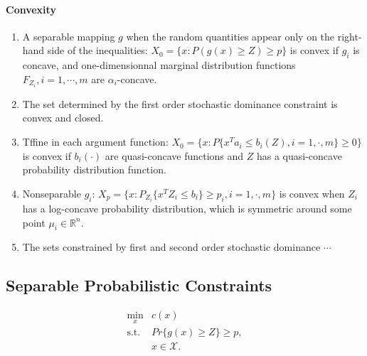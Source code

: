 \documentclass[a4pper,11pt]{article}
\begin{document}
\paragraph{Convexity}
\begin{enumerate}
    \item A separable mapping $g$ when the random quantities appear only on the right-hand side of the inequalities: $X_0=\{x: P(g(x)\geq Z) \geq p\}$ is convex if $g_i$ is concave, and one-dimensionnal marginal distribution functions $F_{Z_i}, i=1,\cdots,m$ are $\alpha_i$-concave.
    \item The set determined by the first order stochastic dominance constraint is convex and closed.
    \item Tffine in each argument function: $X_0=\{x: P\{x^Ta_i\leq b_i(Z),i=1,\cdot, m\}\geq 0\}$ is convex if $b_i(\cdot)$ are quasi-concave functions and $Z$ has a quasi-concave probability distribution function.
    \item Nonseparable $g_i$: $X_p=\{x: P_{Z_i}\{x^TZ_i\leq b_i \}\geq p_i,i=1,\cdot,m\}$ is convex when $Z_i$ has a log-concave probability distribution, which is symmetric around some point $\mu_i\in \mathbb R^n$.
    \item The sets constrained by first and second order stochastic dominance $\cdots$
\end{enumerate}

\subsection{Separable Probabilistic Constraints}
\begin{equation}
    \label{4.1}
    \begin{array}{ll}
        \min_x      & c(x)                    \\
        \text{s.t.} & Pr\{g(x)\geq Z\}\geq p, \\
                    & x\in \mathcal X.
    \end{array}
\end{equation}
\end{document}
